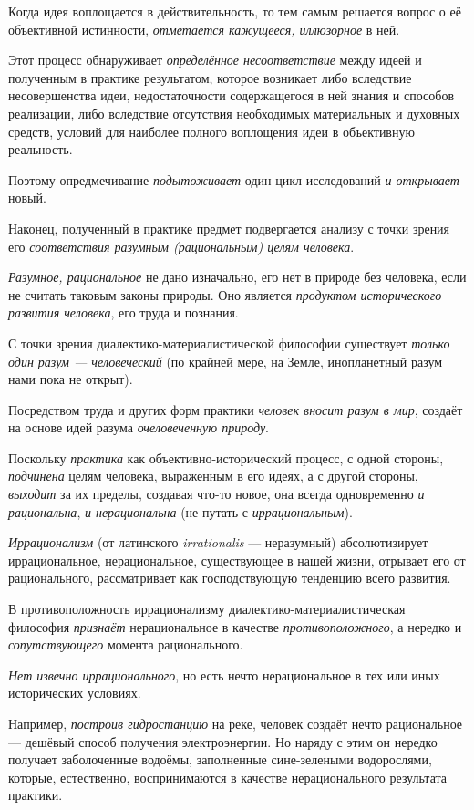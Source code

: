 \documentclass[a4paper,14pt,russian]{extreport}
\begin{document}
Когда идея воплощается в действительность, то тем самым решается вопрос о её объективной истинности, \emph{отметается кажущееся, иллюзорное} в ней.

Этот процесс обнаруживает \emph{определённое несоответствие} между идеей и полученным в практике результатом, которое возникает либо вследствие несовершенства идеи, недостаточности содержащегося в ней знания и способов реализации, либо вследствие отсутствия необходимых материальных и духовных средств, условий для наиболее полного воплощения идеи в объективную реальность.

Поэтому опредмечивание \emph{подытоживает} один цикл исследований \emph{и открывает} новый.

Наконец, полученный в практике предмет подвергается анализу с точки зрения его \emph{соответствия разумным (рациональным) целям человека}.

\emph{Разумное, рациональное} не дано изначально, его нет в природе без человека, если не считать таковым законы природы. Оно является \emph{продуктом исторического развития человека}, его труда и познания.

С точки зрения диалектико-материалистической философии существует \emph{только один разум --- человеческий} (по крайней мере, на Земле, инопланетный разум нами пока не открыт).

Посредством труда и других форм практики \emph{человек вносит разум в мир}, создаёт на основе идей разума \emph{очеловеченную природу}.

Поскольку \emph{практика} как объективно-исторический процесс, с одной стороны, \emph{подчинена} целям человека, выраженным в его идеях, а с другой стороны, \emph{выходит} за их пределы, создавая что-то новое, она всегда одновременно \emph{и рациональна}, \emph{и нерациональна} (не путать с \emph{иррациональным}).

\emph{Иррационализм} (от латинского \emph{irrationalis} --- неразумный) абсолютизирует иррациональное, нерациональное, существующее в нашей жизни, отрывает его от рационального, рассматривает как господствующую тенденцию всего развития.

В противоположность иррационализму диалектико-материалистическая философия \emph{признаёт} нерациональное в качестве \emph{противоположного}, а нередко и \emph{сопутствующего} момента рационального.

\emph{Нет извечно иррационального}, но есть нечто нерациональное в тех или иных исторических условиях.

Например, \emph{построив гидростанцию} на реке, человек создаёт нечто рациональное --- дешёвый способ получения электроэнергии. Но наряду с этим он нередко получает заболоченные водоёмы, заполненные сине-зелеными водорослями, которые, естественно, воспринимаются в качестве нерационального результата практики.
\end{document}
